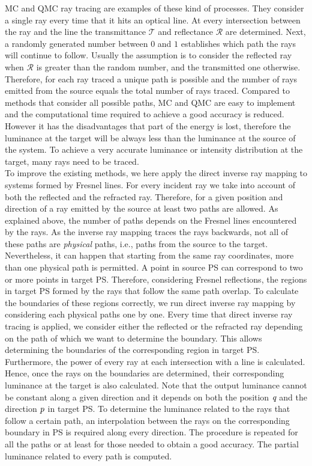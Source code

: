 MC and QMC ray tracing are examples of these kind of processes. They consider a single ray every time that it hits an optical line. At every intersection between the ray and the line the transmittance $\mathcal{T}$ and reflectance $\mathcal{R}$ are determined. Next, a randomly generated number between $0$ and $1$ establishes which path the rays will continue to follow. Usually the assumption is to consider the reflected ray when $\mathcal{R}$ is greater than the random number, and the transmitted one otherwise. Therefore, for each ray traced a unique path is possible and the number of rays emitted from the source equals the total number of rays traced. Compared to methods that consider all possible paths, MC and QMC are easy to implement and the computational time required to achieve a good accuracy is reduced. However it has the disadvantages that part of the energy is lost, therefore the luminance at the target will be always less than the luminance at the source of the system. To achieve a very accurate luminance or intensity distribution at the target, many rays need to be traced.
\\ \indent 
To improve the existing methods, we here apply the direct inverse ray mapping to systems formed by Fresnel lines. For every incident ray we take into account of both the reflected and the refracted ray. Therefore, for a given position and direction of a ray emitted by the source at least two paths are allowed. As explained above, the number of paths depends on the Fresnel lines encountered by the rays. As the inverse ray mapping traces the rays backwards, not all of these paths are \textit{physical} paths, i.e., paths from the source to the target. Nevertheless, it can happen that starting from the same ray coordinates, more than one physical path is permitted. A point in source PS can correspond to two or more points in target PS. Therefore, considering Fresnel reflections, the regions in target PS formed by the rays that follow the same path overlap. To calculate the boundaries of these regions correctly, we run direct inverse ray mapping by considering each physical paths one by one. Every time that direct inverse ray tracing is applied, we consider either the reflected or the refracted ray depending on the path of which we want to determine the boundary. This allows determining the boundaries of the corresponding region in target PS. Furthermore, the power of every ray at each intersection with a line is calculated. Hence, once the rays on the boundaries are determined, their corresponding luminance at the target is also calculated. Note that the output luminance cannot be constant along a given direction and it depends on both the position $\textit{q}$ and the direction $\textit{p}$ in target PS. To determine the luminance related to the rays that follow a certain path, an interpolation between the rays on the corresponding boundary in PS is required along every direction. The procedure is repeated for all the paths or at least for those needed to obtain a good accuracy. The partial luminance related to every path is computed.
